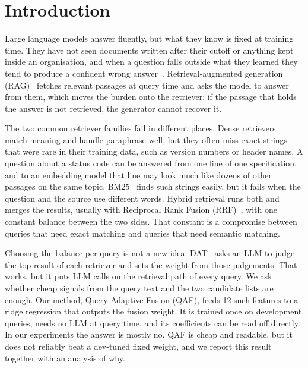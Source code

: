 \section{Introduction}
\label{sec:intro}

Large language models answer fluently, but what they know is fixed at training
time. They have not seen documents written after their cutoff or anything
kept inside an organisation, and when a question falls outside what they
learned they tend to produce a confident wrong
answer~\cite{ji2023hallucination}. Retrieval-augmented generation
(RAG)~\cite{lewis2020rag,gao2023ragsurvey} fetches relevant passages at query
time and asks the model to answer from them, which moves the burden onto the
retriever: if the passage that holds the answer is not retrieved, the
generator cannot recover it.

The two common retriever families fail in different places. Dense
retrievers~\cite{karpukhin2020dpr} match meaning and handle paraphrase well,
but they often miss exact strings that were rare in their training data,
such as version numbers or header names. A question about a status code can
be answered from one line of one specification, and to an embedding model
that line may look much like dozens of other passages on the same topic. BM25~\cite{robertson2009bm25} finds such
strings easily, but it fails when the question and the source use different
words. Hybrid retrieval runs both and merges the results, usually with
Reciprocal Rank Fusion (RRF)~\cite{cormack2009rrf}, with one constant
balance between the two sides. That constant is a compromise between queries
that need exact matching and queries that need semantic matching.

Choosing the balance per query is not a new idea. DAT~\cite{hsu2025dat} asks
an LLM to judge the top result of each retriever and sets the weight from
those judgements. That works, but it puts LLM calls on the retrieval path of
every query. We ask whether cheap signals from the query text and the two
candidate lists are enough. Our
method, Query-Adaptive Fusion (QAF), feeds 12 such features to a ridge
regression that outputs the fusion weight. It is trained once on development
queries, needs no LLM at query time, and its coefficients can be read off
directly. In our experiments the answer is mostly no. QAF is cheap and
readable, but it does not reliably beat a dev-tuned fixed weight, and we
report this result together with an analysis of why.

